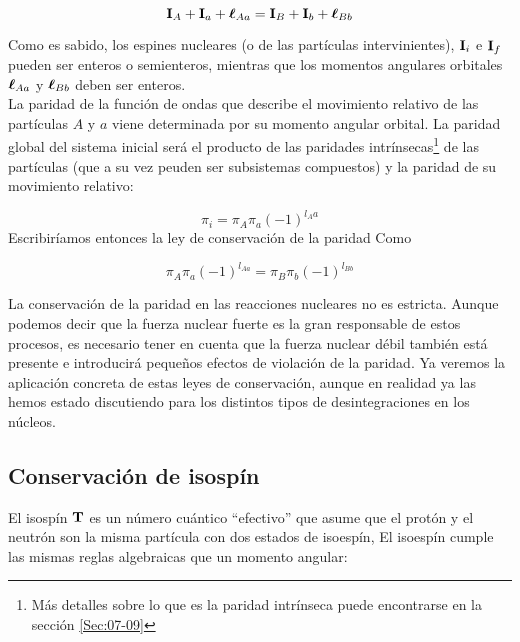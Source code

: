 \begin{mybox}
\begin{equation}
    \mathbf{I}_A + \mathbf{I}_a + \boldsymbol{\ell}_{Aa} = \mathbf{I}_B + \mathbf{I}_b + \boldsymbol{\ell}_{Bb} 
\end{equation}
\end{mybox}
Como es sabido, los espines nucleares (o de las partículas intervinientes), $\mathbf{I}_i$ e $\mathbf{I}_f$ pueden ser enteros o semienteros, mientras que los momentos angulares orbitales $\boldsymbol{\ell}_{Aa}$ y $\boldsymbol{\ell}_{Bb}$ deben ser enteros. \\


La paridad de la función de ondas que describe el movimiento relativo de las partículas $A$ y $a$ viene determinada por su momento angular orbital. La paridad global del sistema inicial será el producto de las paridades intrínsecas\footnote{Más detalles sobre lo que es la paridad intrínseca puede encontrarse en la sección \ref{Sec:07-09}} de las partículas (que a su vez peuden ser subsistemas compuestos) y la paridad de su movimiento relativo:

\begin{equation}
    \pi_i = \pi_A \pi_a (-1)^{l_Aa}
\end{equation}
Escribiríamos entonces la ley de conservación de la paridad Como

\begin{mybox}
\begin{equation}
    \pi_A \pi_a (-1)^{l_{Aa}} = \pi_B \pi_b (-1)^{l_{Bb}}
\end{equation}
\end{mybox}

La conservación de la paridad en las reacciones nucleares no es estricta. Aunque podemos decir que la fuerza nuclear fuerte es la gran responsable de estos procesos, es necesario tener en cuenta que la fuerza nuclear débil también está presente e introducirá pequeños efectos de violación de la paridad. Ya veremos la aplicación concreta de estas leyes de conservación, aunque en realidad ya las hemos estado discutiendo para los distintos tipos de desintegraciones en los núcleos.

\subsection{Conservación de isospín}

El isospín $\mathbf{T}$ es un número cuántico ``efectivo'' que asume que el protón y el neutrón son la misma partícula con dos estados de isoespín, El isoespín cumple las mismas reglas algebraicas que un momento angular:


